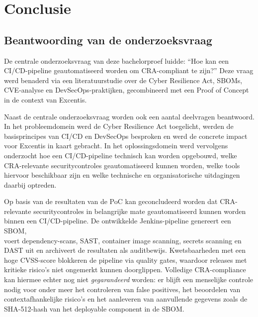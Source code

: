 
\chapter{Conclusie}%
\label{ch:conclusie}


\section{Beantwoording van de onderzoeksvraag}

De centrale onderzoeksvraag van deze bachelorproef luidde: \enquote{Hoe kan een CI/CD-pipeline geautomatiseerd worden om CRA-compliant te zijn?} Deze vraag werd benaderd via een literatuurstudie over de Cyber Resilience Act, SBOMs, CVE-analyse en DevSecOps-praktijken, gecombineerd met een Proof of Concept in de context van Excentis.

Naast de centrale onderzoeksvraag worden ook een aantal deelvragen beantwoord. In het probleemdomein werd de Cyber Resilience Act toegelicht, werden de basisprincipes van CI/CD en DevSecOps besproken en werd de concrete impact voor Excentis in kaart gebracht. In het oplossingsdomein werd vervolgens onderzocht hoe een CI/CD-pipeline technisch kan worden opgebouwd, welke CRA-relevante securitycontroles geautomatiseerd kunnen worden, welke tools hiervoor beschikbaar zijn en welke technische en organisatorische uitdagingen daarbij optreden.

Op basis van de resultaten van de PoC kan geconcludeerd worden dat CRA-relevante securitycontroles in belangrijke mate geautomatiseerd kunnen worden binnen een CI/CD-pipeline. De ontwikkelde Jenkins-pipeline genereert een SBOM, \\voert dependency-scans, SAST, container image scanning, secrets scanning en DAST uit en archiveert de resultaten als auditbewijs. Kwetsbaarheden met een hoge CVSS-score blokkeren de pipeline via quality gates, waardoor releases met kritieke risico's niet ongemerkt kunnen doorglippen. Volledige CRA-compliance kan hiermee echter nog niet \emph{gegarandeerd} worden: er blijft een menselijke controle nodig voor onder meer het controleren van false positives, het beoordelen van contextafhankelijke risico's en het aanleveren van aanvullende gegevens zoals de SHA-512-hash van het deployable component in de SBOM.

